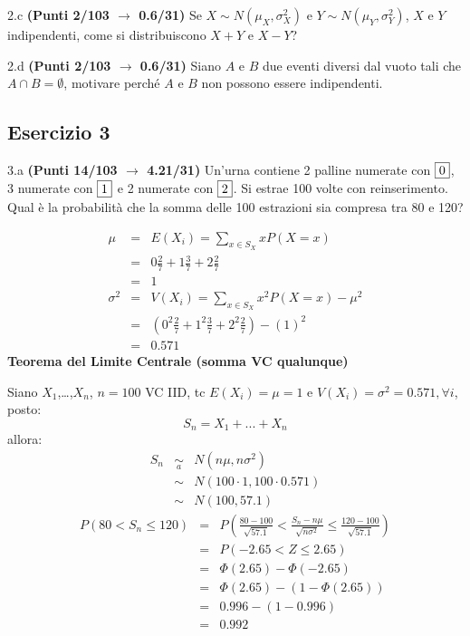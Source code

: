 \documentclass[
  11pt,
]{book}
\theoremstyle{mytheoremstyle}
\theoremstyle{mydefstyle}
\newenvironment{sol}
  {
  \begin{tcolorbox}[enhanced,breakable,arc=0.1mm,boxrule=1pt,colback=white,colframe=iblue,
  title=\bf \fontfamily{lmss}\selectfont \hspace{.5 cm} Soluzione,drop fuzzy shadow]

}{
\end{tcolorbox}
  }
\begin{document}
2.c \textbf{(Punti 2/103 \(\rightarrow\) 0.6/31)} Se \(X\sim N(\mu_X,\sigma_X^2)\) e \(Y\sim N(\mu_Y,\sigma_Y^2)\), \(X\) e \(Y\) indipendenti, come si distribuiscono \(X+Y\) e \(X-Y\)?

2.d \textbf{(Punti 2/103 \(\rightarrow\) 0.6/31)} Siano \(A\) e \(B\) due eventi diversi dal vuoto tali che \(A\cap B=\emptyset\), motivare perché \(A\) e \(B\) non possono essere indipendenti.

\subsection{Esercizio 3}\label{esercizio-3-22}

3.a \textbf{(Punti 14/103 \(\rightarrow\) 4.21/31)} Un'urna contiene 2 palline numerate con \(\fbox{0}\), 3 numerate con \(\fbox{1}\) e 2 numerate con \(\fbox{2}\). Si estrae 100 volte con reinserimento. Qual è la probabilità che la somma delle 100 estrazioni sia compresa tra 80 e 120?

\begin{sol}
\begin{eqnarray*} \mu &=& E(X_i) = \sum_{x\in S_X}x P(X=x)\\ 
 &=&  0  \frac { 2 }{ 7 }+ 1  \frac { 3 }{ 7 }+ 2  \frac { 2 }{ 7 } \\ 
            &=& 1 \\ 
 \sigma^2 &=& V(X_i) = \sum_{x\in S_X}x^2 P(X=x)-\mu^2\\ 
 &=&\left(  0  ^2\frac { 2 }{ 7 }+ 1  ^2\frac { 3 }{ 7 }+ 2  ^2\frac { 2 }{ 7 } \right)-( 1 )^2\\ 
            &=& 0.571 
\end{eqnarray*}
\textbf{Teorema del Limite Centrale (somma VC qualunque)}

Siano \(X_1\),\ldots,\(X_n\), \(n=100\) VC IID, tc \(E(X_i)=\mu=1\) e \(V(X_i)=\sigma^2=0.571,\forall i\), posto:
\[
      S_n = X_1 + ... + X_n
      \]
allora:\begin{eqnarray*}
  S_n & \mathop{\sim}\limits_{a}& N(n\mu,n\sigma^2) \\
     &\sim & N(100\cdot1,100\cdot0.571) \\
     &\sim & N(100,57.1) 
  \end{eqnarray*}\begin{eqnarray*}
   P( 80 < S_n \leq  120 ) &=& P\left( \frac { 80  -  100 }{\sqrt{ 57.1 }} < \frac { S_n  -  n\mu }{ \sqrt{n\sigma^2} } \leq \frac { 120  -  100 }{\sqrt{ 57.1 }}\right)  \\
              &=& P\left(  -2.65  < Z \leq  2.65 \right) \\
              &=& \Phi( 2.65 )-\Phi( -2.65 )\\
              &=&  \Phi( 2.65 )-(1-\Phi( 2.65 )) \\ &=&  0.996 -(1- 0.996 ) \\ 
              &=&  0.992 
   \end{eqnarray*}

\end{sol}
\end{document}
